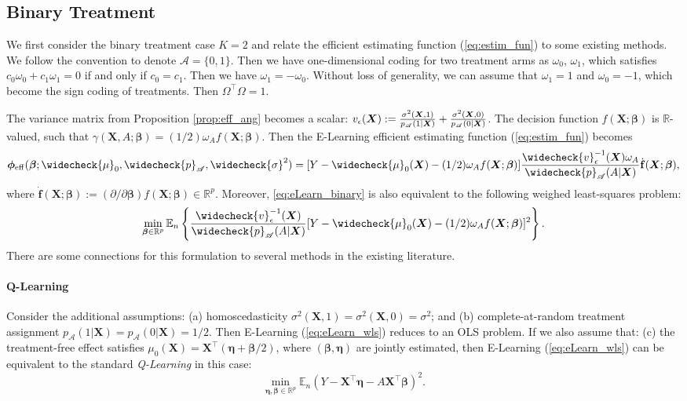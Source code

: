 \documentclass[11pt]{article}
\theoremstyle{definition}
\theoremstyle{remark}
\newcommand{\fb}{\mathbf{f}}
\newcommand{\bX}{\bm{X}}
\newcommand{\bbeta}{\bm{\beta}}
\newcommand{\bmeta}{\bm{\eta}}
\newcommand{\bphi}{\bm{\phi}}
\newcommand{\bbE}{\mathbb{E}}
\newcommand{\bbR}{\mathbb{R}}
\newcommand{\cA}{\mathcal{A}}
\newcommand{\sA}{\mathscr{A}}
\newcommand{\eff}{\mathrm{eff}}
\begin{document}
\subsection{Binary Treatment}\label{sec:binary}
We first consider the binary treatment case $ K = 2 $ and relate the efficient estimating function (\ref{eq:estim_fun}) to some existing methods. We follow the convention to denote $ \cA = \{ 0,1 \} $. Then we have one-dimensional coding for two treatment arms as $ \omega_{0}$, $\omega_{1} $, which satisfies $ c_{0}\omega_{0} + c_{1}\omega_{1} = 0 $  if and only if $ c_{0} = c_{1} $. Then we have $ \omega_{1} = - \omega_{0} $. Without loss of generality, we can assume that $ \omega_{1} = 1 $ and $ \omega_{0} = -1 $, which become the sign coding of treatments. Then $ \Omega^{\intercal}\Omega = 1 $.

The variance matrix from Proposition \ref{prop:eff_ang} becomes a scalar: $ v_{\epsilon}(\bX) := {\sigma^{2}(\bX,1) \over p_{\sA}(1|\bX)} + {\sigma^{2}(\bX,0) \over p_{\sA}(0|\bX)} $. The decision function $ f(\bX;\bbeta) $ is $ \bbR $-valued, such that $ \gamma(\bX,A;\bbeta) = (1/2)\omega_{A}f(\bX;\bbeta) $. Then the E-Learning efficient estimating function (\ref{eq:estim_fun}) becomes
\begin{align}
	\bphi_{\eff}(\bbeta;\widecheck{\mu}_{0},\widecheck{p}_{\sA},\widecheck{\sigma}^{2}) = [Y - \widecheck{\mu}_{0}(\bX) - (1/2)\omega_{A}f(\bX;\bbeta)]{\widecheck{v}_{\epsilon}^{-1}(\bX)\omega_{A} \over \widecheck{p}_{\sA}(A|\bX)}\dot{\fb}(\bX;\bbeta),\label{eq:eLearn_binary}
\end{align}
where $ \dot{\fb}(\bX;\bbeta) := (\partial/\partial\bbeta)f(\bX;\bbeta) \in \bbR^{p} $. Moreover, \eqref{eq:eLearn_binary} is also equivalent to the following weighed least-squares problem:
\begin{align}
	\min_{\bbeta \in \bbR^{p}}\bbE_{n}\left\{ {\widecheck{v}_{\epsilon}^{-1}(\bX) \over \widecheck{p}_{\sA}(A|\bX)}[Y - \widecheck{\mu}_{0}(\bX) - (1/2)\omega_{A}f(\bX;\bbeta)]^{2} \right\}.\label{eq:eLearn_wls}
\end{align}
There are some connections for this formulation to several methods in the existing literature.

\paragraph{Q-Learning}
Consider the additional assumptions: (a) homoscedasticity $ \sigma^{2}(\bX,1) = \sigma^{2}(\bX,0) = \sigma^{2} $; and (b) complete-at-random treatment assignment $ p_{\sA}(1|\bX) = p_{\sA}(0|\bX) = 1/2 $. Then E-Learning (\ref{eq:eLearn_wls}) reduces to an OLS problem. If we also assume that: (c) the treatment-free effect satisfies $ \mu_{0}(\bX) = \bX^{\intercal}(\bmeta + \bbeta/2) $, where $ (\bbeta,\bmeta) $ are jointly estimated, then E-Learning (\ref{eq:eLearn_wls}) can be equivalent to the standard \textit{Q-Learning} \citep{watkins1989learning} in this case:
\[ \min_{\bmeta,\bbeta\in \bbR^{p}}\bbE_{n}(Y - \bX^{\intercal}\bmeta - A\bX^{\intercal}\bbeta)^{2}. \]
\end{document}
